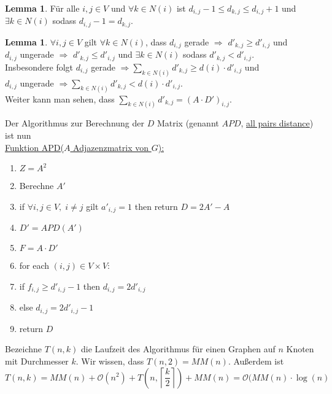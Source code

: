 \documentclass[a4paper, 12pt]{article}
\theoremstyle{plain}
\theoremstyle{definition}
\theoremstyle{lemma}
\newtheorem{lemma}[theorem]{Lemma}
\theoremstyle{remark}
\theoremstyle{corollary}
\theoremstyle{example}
\begin{document}
	\begin{lemma}
		Für alle $i,j \in V$ und $\forall k \in N(i)$ ist $d_{i,j} - 1 \leq d_{k,j} \leq d_{i,j}+1$ und $\exists k \in N(i)$ sodass $d_{i,j}-1 = d_{k,j}$.
	\end{lemma}
	\begin{lemma}
		$\forall i,j \in V$ gilt $\forall k \in N(i)$, dass $d_{i,j}$ gerade $\Rightarrow$ $d'_{k,j} \geq d'_{i,j}$ und \\
		$d_{i,j}$ ungerade $\Rightarrow$ $d'_{k,j} \leq d'_{i,j}$ und $\exists k \in N(i)$ sodass $d'_{k,j} < d'_{i,j}$.\\
		Insbesondere folgt $d_{i,j}$ gerade $\Rightarrow \sum_{k \in N(i)} d'_{k,j} \geq d(i)\cdot d'_{i,j}$ und\\
		$d_{i,j}$ ungerade $\Rightarrow \sum_{k \in N(i)} d'_{k,j} < d(i)\cdot d'_{i,j}$.\\
		Weiter kann man sehen, dass $\sum_{k \in N(i)} d'_{k,j} = (A\cdot D')_{i,j}$.
	\end{lemma}
	Der Algorithmus zur Berechnung der $D$ Matrix (genannt $APD$, \underline{all pairs distance}) ist nun\\
	\underline{Funktion APD($A$ Adjazenzmatrix von $G$):}
	\begin{enumerate}
		\item $Z = A^2$
		\item Berechne $A'$
		\item if $\forall i,j \in V, \; i\neq j$ gilt $a'_{i,j} = 1$ then return $D = 2A'-A$
		\item $D' = APD(A')$
		\item $F = A\cdot D'$
		\item for each $(i,j) \in V\times V$:
		\item if $f_{i,j} \geq d'_{i,j}-1$ then $d_{i,j} = 2d'_{i,j}$
		\item else $d_{i,j} = 2d'_{i,j}-1$
		\item return $D$
	\end{enumerate}
	Bezeichne $T(n,k)$ die Laufzeit des Algorithmus für einen Graphen auf $n$ Knoten mit Durchmesser $k$. Wir wissen, dass $T(n,2) = MM(n)$. Außerdem ist \[T(n,k) = MM(n) + \mathcal{O}(n^2) + T\left(n,\left\lceil\frac{k}{2}\right\rceil\right) + MM(n) = \mathcal{O}(MM(n)\cdot \log(n)\]
\end{document}
